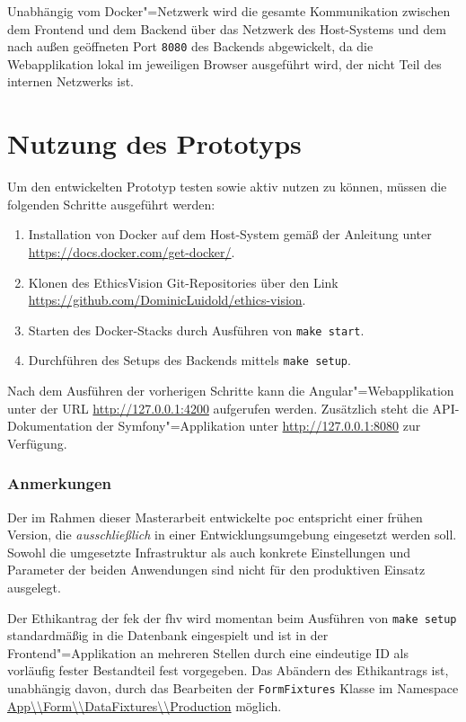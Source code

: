 \documentclass[a4paper,12pt,twoside,numbers=noendperiod]{scrreprt}
\begin{document}
Unabhängig vom Docker"=Netzwerk wird die gesamte Kommunikation zwischen dem Frontend und dem Backend über das Netzwerk des Host-Systems und dem nach außen geöffneten Port \texttt{8080} des Backends abgewickelt, da die Webapplikation lokal im jeweiligen Browser ausgeführt wird, der nicht Teil des internen Netzwerks ist.

\section{Nutzung des Prototyps}
\label{section:nutzung-prototyp}

Um den entwickelten Prototyp testen sowie aktiv nutzen zu können, müssen die folgenden Schritte ausgeführt werden:

\begin{enumerate}
    \item Installation von Docker auf dem Host-System gemäß der Anleitung unter \url{https://docs.docker.com/get-docker/}.
    \item Klonen des EthicsVision Git-Repositories über den Link \url{https://github.com/DominicLuidold/ethics-vision}.
    \item Starten des Docker-Stacks durch Ausführen von \texttt{make start}.
    \item Durchführen des Setups des Backends mittels \texttt{make setup}.
\end{enumerate}

\noindent Nach dem Ausführen der vorherigen Schritte kann die Angular"=Webapplikation unter der URL \url{http://127.0.0.1:4200} aufgerufen werden. Zusätzlich steht die API-Dokumentation der Symfony"=Applikation unter \url{http://127.0.0.1:8080} zur Verfügung.

\subsubsection*{Anmerkungen}
Der im Rahmen dieser Masterarbeit entwickelte \ac{poc} entspricht einer frühen Version, die \textit{ausschließlich} in einer Entwicklungsumgebung eingesetzt werden soll. Sowohl die umgesetzte Infrastruktur als auch konkrete Einstellungen und Parameter der beiden Anwendungen sind nicht für den produktiven Einsatz ausgelegt.

\medskip

Der Ethikantrag der \acl{fek} der \acl{fhv} wird momentan beim Ausführen von \texttt{make setup} standardmäßig in die Datenbank eingespielt und ist in der Frontend"=Applikation an mehreren Stellen durch eine eindeutige ID als vorläufig fester Bestandteil fest vorgegeben. Das Abändern des Ethikantrags ist, unabhängig davon, durch das Bearbeiten der \texttt{FormFixtures} Klasse im Namespace \url{App\\Form\\DataFixtures\\Production} möglich.
\end{document}
